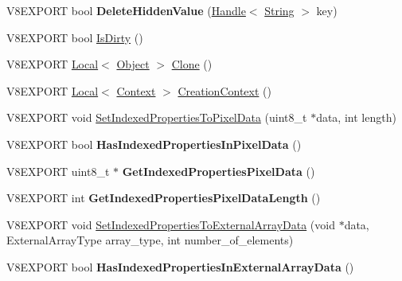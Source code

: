 \begin{DoxyCompactItemize}
\item 
\hypertarget{classv8_1_1_object_ac88c826e949768226fc88a812110038c}{}V8\+E\+X\+P\+O\+R\+T bool {\bfseries Delete\+Hidden\+Value} (\hyperlink{classv8_1_1_handle}{Handle}$<$ \hyperlink{classv8_1_1_string}{String} $>$ key)\label{classv8_1_1_object_ac88c826e949768226fc88a812110038c}

\item 
V8\+E\+X\+P\+O\+R\+T bool \hyperlink{classv8_1_1_object_a76d0c5021dd74a57239ad64d1cb1c83c}{Is\+Dirty} ()
\item 
V8\+E\+X\+P\+O\+R\+T \hyperlink{classv8_1_1_local}{Local}$<$ \hyperlink{classv8_1_1_object}{Object} $>$ \hyperlink{classv8_1_1_object_a45a67c1b0408922403048b59a5bc22b2}{Clone} ()
\item 
V8\+E\+X\+P\+O\+R\+T \hyperlink{classv8_1_1_local}{Local}$<$ \hyperlink{classv8_1_1_context}{Context} $>$ \hyperlink{classv8_1_1_object_a509f00335e1e0ddfc4bcf93d9e1cb567}{Creation\+Context} ()
\item 
V8\+E\+X\+P\+O\+R\+T void \hyperlink{classv8_1_1_object_a3f08aee708af5e2856e65e81b22edc61}{Set\+Indexed\+Properties\+To\+Pixel\+Data} (uint8\+\_\+t $\ast$data, int length)
\item 
\hypertarget{classv8_1_1_object_a559c5db719c43a40b5f615a0c955dbaa}{}V8\+E\+X\+P\+O\+R\+T bool {\bfseries Has\+Indexed\+Properties\+In\+Pixel\+Data} ()\label{classv8_1_1_object_a559c5db719c43a40b5f615a0c955dbaa}

\item 
\hypertarget{classv8_1_1_object_af9f801a1165992961f902fbee25fbe87}{}V8\+E\+X\+P\+O\+R\+T uint8\+\_\+t $\ast$ {\bfseries Get\+Indexed\+Properties\+Pixel\+Data} ()\label{classv8_1_1_object_af9f801a1165992961f902fbee25fbe87}

\item 
\hypertarget{classv8_1_1_object_a39892346c98e665c02b410ebdf58a7b0}{}V8\+E\+X\+P\+O\+R\+T int {\bfseries Get\+Indexed\+Properties\+Pixel\+Data\+Length} ()\label{classv8_1_1_object_a39892346c98e665c02b410ebdf58a7b0}

\item 
V8\+E\+X\+P\+O\+R\+T void \hyperlink{classv8_1_1_object_a53be627cd653a5591038a4d81a908f64}{Set\+Indexed\+Properties\+To\+External\+Array\+Data} (void $\ast$data, External\+Array\+Type array\+\_\+type, int number\+\_\+of\+\_\+elements)
\item 
\hypertarget{classv8_1_1_object_a92c4c4b66d3dd30d77bdea30a20ec4f7}{}V8\+E\+X\+P\+O\+R\+T bool {\bfseries Has\+Indexed\+Properties\+In\+External\+Array\+Data} ()\label{classv8_1_1_object_a92c4c4b66d3dd30d77bdea30a20ec4f7}


\end{DoxyCompactItemize}
